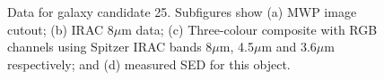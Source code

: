 \documentclass[times,usenatbib]{mn2e}
\begin{document}
\begin{figure}
\begin{center}
\caption{Data for galaxy candidate 25. Subfigures show (a) MWP image cutout; (b) IRAC 8$\mu$m data; (c) Three-colour composite with RGB channels using Spitzer IRAC bands 8$\mu$m, 4.5$\mu$m and 3.6$\mu$m respectively; and (d) measured SED for this object.}
\label{gal25}
\end{center}
\end{figure} 
\end{document}

